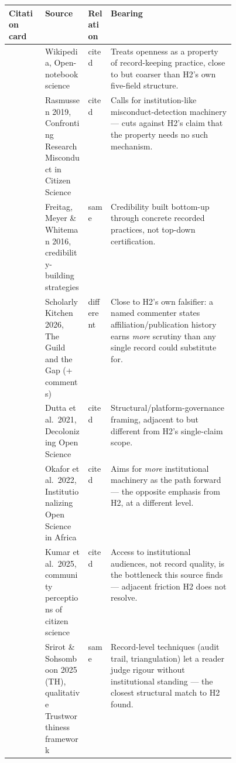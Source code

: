 \documentclass[10pt,twocolumn]{article}
\begin{document}
\begin{table}[t]
\centering
\scriptsize
\begin{tabularx}{\linewidth}{@{}p{0.16\linewidth} p{0.19\linewidth} p{0.1\linewidth} X@{}}
\toprule
\textbf{Citation card} & \textbf{Source} & \textbf{Relation} & \textbf{Bearing} \\
\midrule
\cite{cite-rigour-without-infrastructure-001} & Wikipedia, Open-notebook science & cited & Treats openness as a property of record-keeping practice, close to but coarser than H2's own five-field structure. \\
\cite{cite-rigour-without-infrastructure-002} & Rasmussen 2019, Confronting Research Misconduct in Citizen Science & cited & Calls for institution-like misconduct-detection machinery --- cuts against H2's claim that the property needs no such mechanism. \\
\cite{cite-rigour-without-infrastructure-003} & Freitag, Meyer \& Whiteman 2016, credibility-building strategies & same & Credibility built bottom-up through concrete recorded practices, not top-down certification. \\
\cite{cite-rigour-without-infrastructure-004} & Scholarly Kitchen 2026, The Guild and the Gap (+ comments) & different & Close to H2's own falsifier: a named commenter states affiliation/publication history earns \emph{more} scrutiny than any single record could substitute for. \\
\cite{cite-rigour-without-infrastructure-005} & Dutta et al.\ 2021, Decolonizing Open Science & cited & Structural/platform-governance framing, adjacent to but different from H2's single-claim scope. \\
\cite{cite-rigour-without-infrastructure-006} & Okafor et al.\ 2022, Institutionalizing Open Science in Africa & cited & Aims for \emph{more} institutional machinery as the path forward --- the opposite emphasis from H2, at a different level. \\
\cite{cite-rigour-without-infrastructure-007} & Kumar et al.\ 2025, community perceptions of citizen science & cited & Access to institutional audiences, not record quality, is the bottleneck this source finds --- adjacent friction H2 does not resolve. \\
\cite{cite-rigour-without-infrastructure-008} & Srirot \& Sohsomboon 2025 (TH), qualitative Trustworthiness framework & same & Record-level techniques (audit trail, triangulation) let a reader judge rigour without institutional standing --- the closest structural match to H2 found. \\

\end{tabularx}
\end{table}
\end{document}
